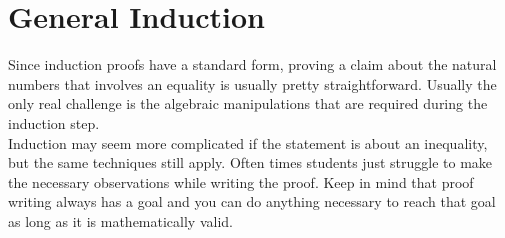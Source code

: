 \chapter{General Induction}


\noindent Since induction proofs have a standard form, proving a claim about the natural numbers that involves an equality is usually pretty straightforward.  Usually the only real challenge is the algebraic manipulations that are required during the induction step.\\

Induction may seem more complicated if the statement is about an inequality, but the same techniques still apply.  Often times students just struggle to make the necessary observations while writing the proof.  Keep in mind that proof writing always has a goal and you can do anything necessary to reach that goal as long as it is mathematically valid.

\begin{center}
\end{center}

